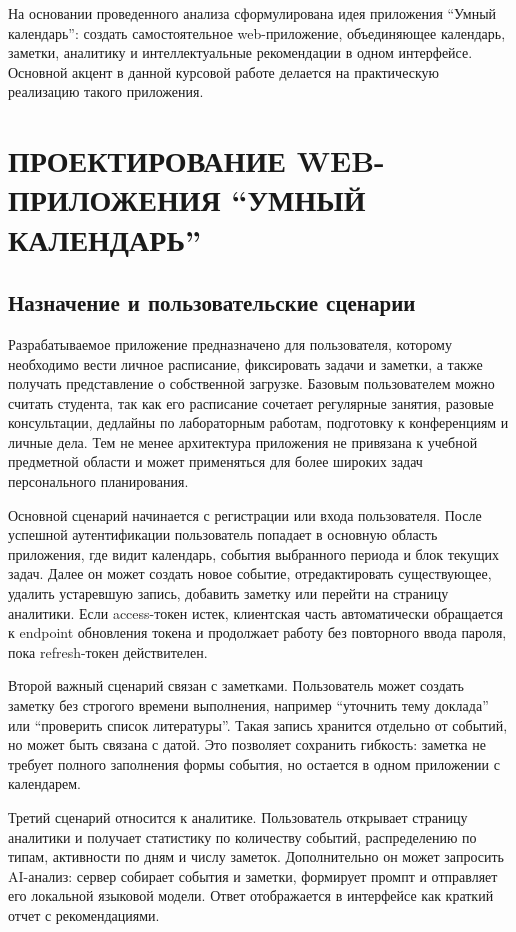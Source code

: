 \documentclass[14pt,a4paper]{extreport}
\begin{document}
На основании проведенного анализа сформулирована идея приложения ``Умный календарь'': создать самостоятельное web-приложение, объединяющее календарь, заметки, аналитику и интеллектуальные рекомендации в одном интерфейсе. Основной акцент в данной курсовой работе делается на практическую реализацию такого приложения.

\chapter{ПРОЕКТИРОВАНИЕ WEB-ПРИЛОЖЕНИЯ ``УМНЫЙ КАЛЕНДАРЬ''}

\section{Назначение и пользовательские сценарии}

Разрабатываемое приложение предназначено для пользователя, которому необходимо вести личное расписание, фиксировать задачи и заметки, а также получать представление о собственной загрузке. Базовым пользователем можно считать студента, так как его расписание сочетает регулярные занятия, разовые консультации, дедлайны по лабораторным работам, подготовку к конференциям и личные дела. Тем не менее архитектура приложения не привязана к учебной предметной области и может применяться для более широких задач персонального планирования.

Основной сценарий начинается с регистрации или входа пользователя. После успешной аутентификации пользователь попадает в основную область приложения, где видит календарь, события выбранного периода и блок текущих задач. Далее он может создать новое событие, отредактировать существующее, удалить устаревшую запись, добавить заметку или перейти на страницу аналитики. Если access-токен истек, клиентская часть автоматически обращается к endpoint обновления токена и продолжает работу без повторного ввода пароля, пока refresh-токен действителен.

Второй важный сценарий связан с заметками. Пользователь может создать заметку без строгого времени выполнения, например ``уточнить тему доклада'' или ``проверить список литературы''. Такая запись хранится отдельно от событий, но может быть связана с датой. Это позволяет сохранить гибкость: заметка не требует полного заполнения формы события, но остается в одном приложении с календарем.

Третий сценарий относится к аналитике. Пользователь открывает страницу аналитики и получает статистику по количеству событий, распределению по типам, активности по дням и числу заметок. Дополнительно он может запросить AI-анализ: сервер собирает события и заметки, формирует промпт и отправляет его локальной языковой модели. Ответ отображается в интерфейсе как краткий отчет с рекомендациями.
\end{document}
